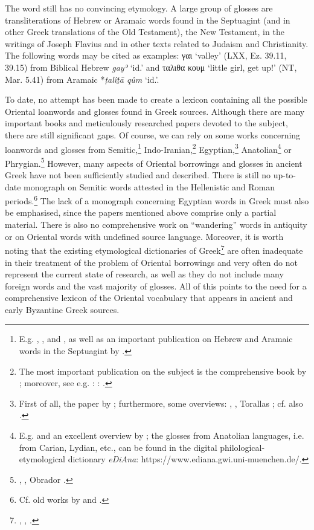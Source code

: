 \documentclass[output=paper,colorlinks,citecolor=brown,arabicfont,chinesefont]{langscibook}
\begin{document}
The word still has no convincing etymology. A large group of glosses are transliterations of Hebrew or Aramaic words found in the Septuagint (and in other Greek translations of the Old Testament), the New Testament, in the writings of Joseph Flavius and in other texts related to Judaism and Christianity. The following words may be cited as examples: γαι ‘valley’ (LXX, Ez. 39.11, 39.15) from Biblical Hebrew \emph{gayʾ} ‘id.’ and ταλιθα κουμ ‘little girl, get up!’ (NT, Mar. 5.41) from Aramaic *\emph{ṭalîṯā qûm} ‘id.’.

To date, no attempt has been made to create a lexicon containing all the possible Oriental loanwords and glosses found in Greek sources. Although there are many important books and meticulously researched papers devoted to the subject, there are still significant gaps. Of course, we can rely on some works concerning loanwords and glosses from Semitic,\footnote{E.g. \citealt{Masson1967},  \citealt{Bai2009},  \citealt{Rosol2013} and \citealt{Rosol2018}, as well as an important publication on Hebrew and Aramaic words in the Septuagint by \citealt{Simotas1968} .}  Indo-Iranian,\footnote{The most important publication on the subject is the comprehensive book by \citealt{Brust2008} ; moreover, see e.g. \citealt{Schmitt1967}:  \citealt{Hinz1975}:  \citealt{Huyse1990} .}  Egyptian,\footnote{First of all, the paper by \citealt{Fournet1989} ; furthermore, some overviews: \citealt{Hemmerdinger1968},  \citealt{Mcgready1968},  Torallas \citealt{Tovar2004} ; cf. also \citealt{Pierce1971} .}  Anatolian\footnote{E.g. \citealt{Neumann1961}  and an excellent overview by \citealt{Simon2018} ; the glosses from Anatolian languages, i.e. from Carian, Lydian, etc., can be found in the digital philological-etymological dictionary \emph{eDiAna}: https://www.ediana.gwi.uni-muenchen.de/.}  or Phrygian.\footnote{\citealt{Haas1960}, \citealt[39--68]{Sowa2008}, Obrador \citealt[412--424]{Obrador-cursach2020}.}  However, many aspects of Oriental borrowings and glosses in ancient Greek have not been sufficiently studied and described. There is still no up-to-date monograph on Semitic words attested in the Hellenistic and Roman periods.\footnote{Cf. old works by \citealt{Lewy1895}  and \citealt{Muss-arnolt1892} .}  The lack of a monograph concerning Egyptian words in Greek must also be emphasised, since the papers mentioned above comprise only a partial material. There is also no comprehensive work on “wandering” words in antiquity or on Oriental words with undefined source language. Moreover, it is worth noting that the existing etymological dictionaries of Greek\footnote{\citealt[72]{Frisk1960}, \citealt{Chantraine1999},  \citealt{Beekes2010} .}  are often inadequate in their treatment of the problem of Oriental borrowings and very often do not represent the current state of research, as well as they do not include many foreign words and the vast majority of glosses. All of this points to the need for a comprehensive lexicon of the Oriental vocabulary that appears in ancient and early Byzantine Greek sources.
\end{document}
